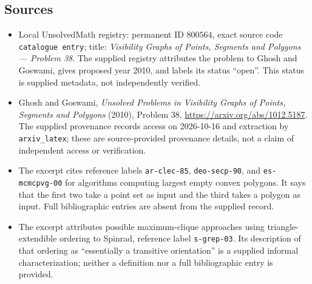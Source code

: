 \documentclass[11pt]{article}
\begin{document}
\subsection{Sources}
\begin{itemize}
\item Local UnsolvedMath registry: permanent ID \(800564\), exact source code \texttt{catalogue entry}; title: \emph{Visibility Graphs of Points, Segments and Polygons --- Problem 38}. The supplied registry attributes the problem to Ghosh and Goswami, gives proposed year 2010, and labels its status ``open''. This status is supplied metadata, not independently verified.
\item Ghosh and Goswami, \emph{Unsolved Problems in Visibility Graphs of Points, Segments and Polygons} (2010), Problem 38, \url{https://arxiv.org/abs/1012.5187}. The supplied provenance records access on 2026-10-16 and extraction by \texttt{arxiv\_latex}; these are source-provided provenance details, not a claim of independent access or verification.
\item The excerpt cites reference labels \texttt{ar-clec-85}, \texttt{deo-secp-90}, and \texttt{es-mcmcpvg-00} for algorithms computing largest empty convex polygons. It says that the first two take a point set as input and the third takes a polygon as input. Full bibliographic entries are absent from the supplied record.
\item The excerpt attributes possible maximum-clique approaches using triangle-extendible ordering to Spinrad, reference label \texttt{s-grep-03}. Its description of that ordering as ``essentially a transitive orientation'' is a supplied informal characterization; neither a definition nor a full bibliographic entry is provided.
\end{itemize}
\end{document}
